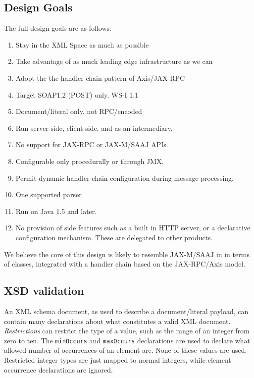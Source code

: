 \subsection{Design Goals}
\label{alpine:design}

The full design goals are as follows:

\begin{enumerate}

\item Stay in the XML Space as much as possible
\item Take advantage of as much leading edge infrastructure as we can
\item Adopt the the handler chain pattern of Axis/JAX-RPC
\item Target SOAP1.2 (POST) only, WS-I 1.1
\item Document/literal only, not RPC/encoded
\item Run server-side, client-side, and as an intermediary. 
\item No support for JAX-RPC or JAX-M/SAAJ APIs.
\item Configurable only procedurally or through JMX.
\item Permit dynamic handler chain configuration during message processing.
\item One supported parser %
\item Run on Java 1.5 and later. 

\item No provision of side features such as a built in HTTP server, or
a declarative configuration mechanism. These are delegated to other products.
\end{enumerate}

We believe the core of this design is likely to resemble JAX-M/SAAJ in
in terms of classes, integrated with a handler chain based on the
JAX-RPC/Axis model.

\subsection{XSD validation}
\label{alpine:validation}
An XML schema document, as used to describe a document/literal
payload, can contain many declarations about what constitutes a valid
XML document. \emph{Restrictions} can restrict the type of a value,
such as the range of an integer from zero to ten. The \verb|minOccurs|
and \verb|maxOccurs| declarations are used to declare what allowed
number of occurrences of an element are. None of these values are
used. Restricted integer types are just mapped to normal integers,
while element occurrence declarations are ignored.

